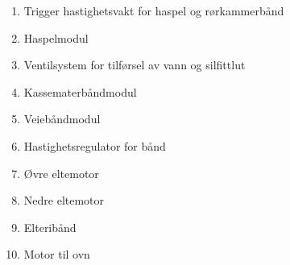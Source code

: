 \begin{enumerate}
  \item Trigger hastighetsvakt for haspel og rørkammerbånd
  \item Haspelmodul
  \item Ventilsystem for tilførsel av vann og silfittlut
  \item Kassematerbåndmodul
  \item Veiebåndmodul
  \item Hastighetsregulator for bånd
  \item Øvre eltemotor
  \item Nedre eltemotor
  \item Elteribånd
  \item Motor til ovn
\end{enumerate}
